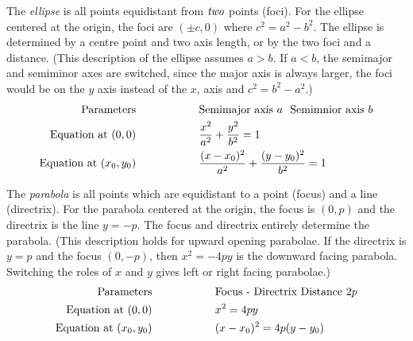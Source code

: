 \documentclass[fleqn,letterpaper]{report}
\begin{document}
\begin{defn}
The \emph{ellipse} is all points equidistant from $\emph{two}$ points
(foci). For the ellipse centered at the origin, the foci are
$(\pm c,0)$ where $c^2 = a^2 - b^2$. The ellipse is
determined by a centre point and two axis length, or by the
two foci and a distance. (This description of the ellipse
assumes $a > b$. If $a < b$, the semimajor and semiminor axes
are switched, since the major axis is always larger, the foci
would be on the $y$ axis instead of the $x$, axis and $c^2 =
b^2 - a^2$.) 
\begin{align*}
\text{Parameters} \hspace{2cm} & \text{Semimajor axis } a \ \ 
\text{Semimnior axis } b \vspace{0.3cm} \\
\text{Equation at } (0,0) \hspace{2cm} & \frac{x^2}{a^2} +
\frac{y^2}{b^2} = 1 \vspace{0.3cm} \\
\text{Equation at } (x_0, y_0) \hspace{2cm} &
\frac{(x-x_0)^2}{a^2} + \frac{(y-y_0)^2}{b^2} = 1
\vspace{0.3cm} \\
\end{align*}
\end{defn}

\begin{defn}
The \emph{parabola} is all points which are equidistant to a point
(focus) and a line (directrix). For the parabola centered at the
origin, the focus is $(0,p)$ and the directrix is the line $y = -p$.
The focus and directrix entirely determine the parabola.
(This description holds for upward opening parabolae. If the
directrix is $y = p$ and the focus $(0, -p)$, then $x^2 = -4py$ is
the downward facing parabola. Switching the roles of $x$ and $y$
gives left or right facing parabolae.)
\begin{align*}
\text{Parameters} \hspace{2cm} & \text{Focus - Directrix
Distance } 2p \vspace{0.3cm} \\
\text{Equation at } (0,0) \hspace{2cm} & x^2 = 4py
\vspace{0.3cm} \\
\text{Equation at } (x_0, y_0) \hspace{2cm} & (x-x_0)^2 =
4p(y-y_0) \vspace{0.3cm} \\
\end{align*}
\end{defn}
\end{document}

